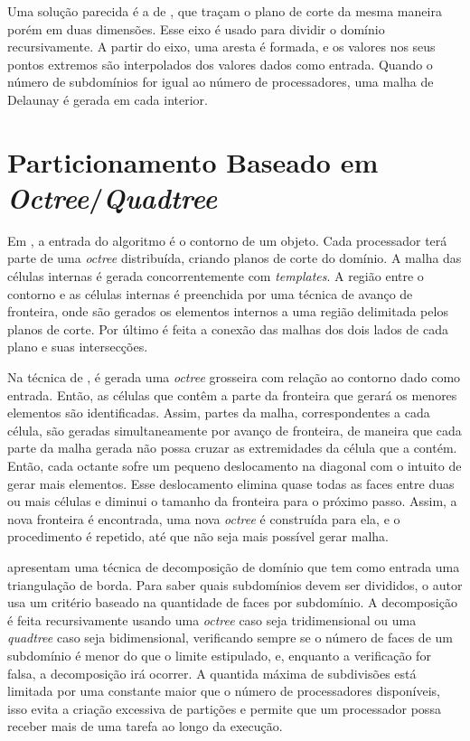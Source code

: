 Uma solução parecida é a de \citet{bib:Lammer00}, que traçam o plano de corte da mesma maneira porém em duas dimensões. Esse eixo é usado para dividir o domínio recursivamente. A partir do eixo, uma aresta é formada, e os valores nos seus pontos extremos são interpolados dos valores dados como entrada. Quando o número de subdomínios for igual ao número de processadores, uma malha de Delaunay é gerada em cada interior.

\section{Particionamento Baseado em \textit{Octree}/\textit{Quadtree}}

Em \citet{bib:deCougny99}, a entrada do algoritmo é o contorno de um objeto. Cada processador terá parte de uma \textit{octree} distribuída, criando planos de corte do domínio. A malha das células internas é gerada concorrentemente com \textit{templates}. A região entre o contorno e as células internas é preenchida por uma técnica de avanço de fronteira, onde são gerados os elementos internos a uma região delimitada pelos planos de corte. Por último é feita a conexão das malhas dos dois lados de cada plano e suas intersecções.

Na técnica de \citet{bib:Lohner01}, é gerada uma \textit{octree} grosseira com relação ao contorno dado como entrada. Então, as células que contêm a parte da fronteira que gerará os menores elementos são identificadas. Assim, partes da malha, correspondentes a cada célula, são geradas simultaneamente por avanço de fronteira, de maneira que cada parte da malha gerada não possa cruzar as extremidades da célula que a contém. Então, cada octante sofre um pequeno deslocamento na diagonal com o intuito de gerar mais elementos. Esse deslocamento elimina quase todas as faces entre duas ou mais células e diminui o tamanho da fronteira para o próximo passo. Assim, a nova fronteira é encontrada, uma nova \textit{octree} é construída para ela, e o procedimento é repetido, até que não seja mais possível gerar malha.

\citet{bib:Larwood03} apresentam uma técnica de decomposição de domínio que tem como entrada uma triangulação de borda. Para saber quais subdomínios devem ser divididos, o autor usa um critério baseado na quantidade de faces por subdomínio. A decomposição é feita recursivamente usando uma \textit{octree} caso seja tridimensional ou uma \textit{quadtree} caso seja bidimensional, verificando sempre se o número de faces de um subdomínio é menor do que o limite estipulado, e, enquanto a verificação for falsa, a decomposição irá ocorrer. A quantida máxima de subdivisões está limitada por uma constante maior que o número de processadores disponíveis, isso evita a criação excessiva de partições e permite que um processador possa receber mais de uma tarefa ao longo da execução.

